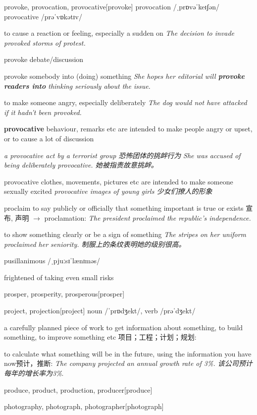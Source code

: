 \begin{DefWord}{provoke, provocation, provocative}[provoke]
    provocation /ˌprɒvəˈkeɪʃən/ provocative /prəˈvɒkətɪv/


    to cause a reaction or feeling, especially a sudden on
    \textit{The decision to invade provoked storms of protest.}

    provoke debate/discussion

    provoke somebody into (doing) something
    \textit{She hopes her editorial will \textbf{provoke readers into} thinking seriously about the issue.}

    to make someone angry, especially deliberately
    \textit{The dog would not have attacked if it hadn't been provoked.}

    \textbf{provocative}  behaviour, remarks etc are intended to make people angry or upset, or to cause a lot of discussion

    \textit{a provocative act by a terrorist group 恐怖团体的挑衅行为}
    \textit{She was accused of being deliberately provocative. 她被指责故意挑衅。 }

    provocative clothes, movements, pictures etc are intended to make someone sexually excited
    \textit{provocative images of young girls 少女们撩人的形象}
\end{DefWord}

\begin{DefWord}{proclaim}
    to say publicly or officially that something important is true or exists 宣布, 声明 $\rightarrow$ proclamation:
    \textit{The president proclaimed the republic's independence.}

    to show something clearly or be a sign of something
    \textit{The stripes on her uniform proclaimed her seniority. 制服上的条纹表明她的级别很高。 }

\end{DefWord}

\begin{DefWord}{pusillanimous}
    /ˌpjuːsɪˈlænɪməs/
    
    frightened of taking even small risks
\end{DefWord}

\begin{DefWord}{prosper, prosperity, prosperous}[prosper]
\end{DefWord}

\begin{DefWord}{project, projection}[project]
    noun  /ˈprɒdʒekt/, verb /prəˈdʒekt/
    
    a carefully planned piece of work to get information about something, to build something, to improve something etc 项目；工程；计划；规划:
    
    to calculate what something will be in the future, using the information you have now预计，推断:
     \textit{The company projected an annual growth rate of 3\%. 该公司预计每年的增长率为3\%}. 
    
 \end{DefWord}
    
 \begin{DefWord}{produce, product, production, producer}[produce]
 \end{DefWord}

 \begin{DefWord}{photography, photograph, photographer}[photograph]
 \end{DefWord}